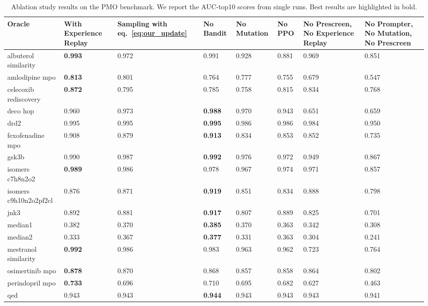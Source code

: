 \begin{sidewaystable}[ht]
\centering
\caption{Ablation study results on the PMO benchmark. We report the AUC-top10 scores from single runs. Best results are highlighted in bold.}
\label{tab:ablation}
\begin{tabularx}{\linewidth}{l|Y Y Y Y Y Y Y }
\toprule
Oracle & With Experience Replay & Sampling with eq.~\ref{eq:our_update} & No Bandit & No Mutation & No PPO & No Prescreen, No Experience Replay & No Prompter, No Mutation, No Prescreen \\
\midrule
\small{albuterol similarity} & \textbf{0.993} & 0.972 & 0.991 & 0.928 & 0.881 & 0.969 & 0.851 \\
\small{amlodipine mpo} & \textbf{0.813} & 0.801 & 0.764 & 0.777 & 0.755 & 0.679 & 0.547 \\
\small{celecoxib rediscovery} & \textbf{0.872} & 0.795 & 0.785 & 0.758 & 0.815 & 0.834 & 0.768 \\
\small{deco hop} & 0.960 & 0.973 & \textbf{0.988} & 0.970 & 0.943 & 0.651 & 0.659 \\
\small{drd2} & 0.995 & 0.995 & \textbf{0.995} & 0.986 & 0.986 & 0.984 & 0.950 \\
\small{fexofenadine mpo} & 0.908 & 0.879 & \textbf{0.913} & 0.834 & 0.853 & 0.852 & 0.735 \\
\small{gsk3b} & 0.990 & 0.987 & \textbf{0.992} & 0.976 & 0.972 & 0.949 & 0.867 \\
\small{isomers c7h8n2o2} & \textbf{0.989} & 0.986 & 0.978 & 0.967 & 0.974 & 0.971 & 0.857 \\
\small{isomers c9h10n2o2pf2cl} & 0.876 & 0.871 & \textbf{0.919} & 0.851 & 0.834 & 0.888 & 0.798 \\
\small{jnk3} & 0.892 & 0.881 & \textbf{0.917} & 0.807 & 0.889 & 0.825 & 0.701 \\
\small{median1} & 0.382 & 0.370 & \textbf{0.385} & 0.370 & 0.363 & 0.342 & 0.308 \\
\small{median2} & 0.333 & 0.367 & \textbf{0.377} & 0.331 & 0.363 & 0.304 & 0.241 \\
\small{mestranol similarity} & \textbf{0.992} & 0.986 & 0.983 & 0.963 & 0.962 & 0.723 & 0.764 \\
\small{osimertinib mpo} & \textbf{0.878} & 0.870 & 0.868 & 0.857 & 0.858 & 0.864 & 0.802 \\
\small{perindopril mpo} & \textbf{0.733} & 0.696 & 0.710 & 0.695 & 0.682 & 0.627 & 0.463 \\
\small{qed} & 0.943 & 0.943 & \textbf{0.944} & 0.943 & 0.943 & 0.943 & 0.941 \\

\end{tabularx}
\end{sidewaystable}
